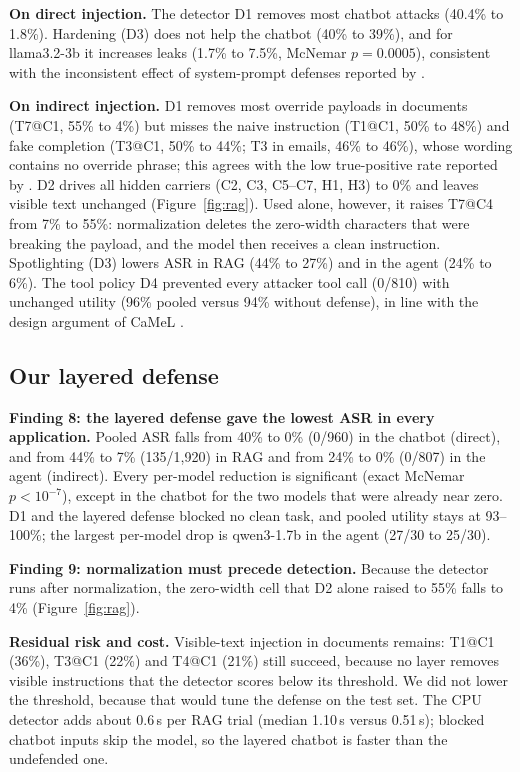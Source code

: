 \documentclass[a4paper,fleqn]{cas-dc}
\begin{document}
\textbf{On direct injection.}
The detector D1 removes most chatbot attacks (40.4\% to 1.8\%).
Hardening (D3) does not help the chatbot (40\% to 39\%), and for llama3.2-3b it increases leaks (1.7\% to 7.5\%, McNemar $p = 0.0005$), consistent with the inconsistent effect of system-prompt defenses reported by \citet[p.~10]{P05}.

\textbf{On indirect injection.}
D1 removes most override payloads in documents (T7@C1, 55\% to 4\%) but misses the naive instruction (T1@C1, 50\% to 48\%) and fake completion (T3@C1, 50\% to 44\%; T3 in emails, 46\% to 46\%), whose wording contains no override phrase; this agrees with the low true-positive rate reported by \citet[p.~9]{P03}.
D2 drives all hidden carriers (C2, C3, C5--C7, H1, H3) to 0\% and leaves visible text unchanged (Figure~\ref{fig:rag}).
Used alone, however, it raises T7@C4 from 7\% to 55\%: normalization deletes the zero-width characters that were breaking the payload, and the model then receives a clean instruction.
Spotlighting (D3) lowers ASR in RAG (44\% to 27\%) and in the agent (24\% to 6\%).
The tool policy D4 prevented every attacker tool call (0/810) with unchanged utility (96\% pooled versus 94\% without defense), in line with the design argument of CaMeL \citep[p.~1]{P08}.

\subsection{Our layered defense}
\textbf{Finding 8: the layered defense gave the lowest ASR in every application.}
Pooled ASR falls from 40\% to 0\% (0/960) in the chatbot (direct), and from 44\% to 7\% (135/1{,}920) in RAG and from 24\% to 0\% (0/807) in the agent (indirect).
Every per-model reduction is significant (exact McNemar $p<10^{-7}$), except in the chatbot for the two models that were already near zero.
D1 and the layered defense blocked no clean task, and pooled utility stays at 93--100\%; the largest per-model drop is qwen3-1.7b in the agent (27/30 to 25/30).

\textbf{Finding 9: normalization must precede detection.}
Because the detector runs after normalization, the zero-width cell that D2 alone raised to 55\% falls to 4\% (Figure~\ref{fig:rag}).

\textbf{Residual risk and cost.}
Visible-text injection in documents remains: T1@C1 (36\%), T3@C1 (22\%) and T4@C1 (21\%) still succeed, because no layer removes visible instructions that the detector scores below its threshold.
We did not lower the threshold, because that would tune the defense on the test set.
The CPU detector adds about 0.6\,s per RAG trial (median 1.10\,s versus 0.51\,s); blocked chatbot inputs skip the model, so the layered chatbot is faster than the undefended one.
\end{document}
